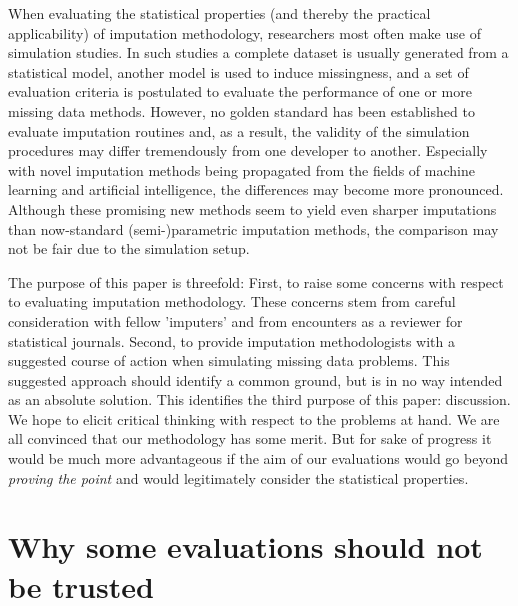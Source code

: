 \documentclass[bimj,fleqn]{w-art}
\theoremstyle{plain}
\theoremstyle{definition}
\begin{document}
When evaluating the statistical properties (and thereby the practical applicability) of imputation methodology, researchers most often make use of simulation studies. In such studies a complete dataset is usually generated from a statistical model, another model is used to induce missingness, and a set of evaluation criteria is postulated to evaluate the performance of one or more missing data methods. However, no golden standard has been established to evaluate imputation routines and, as a result, the validity of the simulation procedures may differ tremendously from one developer to another. Especially with novel imputation methods being propagated from the fields of machine learning and artificial intelligence, the differences may become more pronounced. Although these promising new methods seem to yield even sharper imputations than now-standard (semi-)parametric imputation methods, the comparison may not be fair due to the simulation setup. 


The purpose of this paper is threefold: First, to raise some concerns with respect to evaluating imputation methodology. These concerns stem from careful consideration with fellow 'imputers' and from encounters as a reviewer for statistical journals. Second, to provide imputation methodologists with a suggested course of action when simulating missing data problems. This suggested approach should identify a common ground, but is in no way intended as an absolute solution. This identifies the third purpose of this paper: discussion. We hope to elicit critical thinking with respect to the problems at hand. We are all convinced that our methodology has some merit. But for sake of progress it would be much more advantageous if the aim of our evaluations would go beyond \emph{proving the point} and would legitimately consider the statistical properties. 



\section{Why some evaluations should not be trusted}
\end{document}
